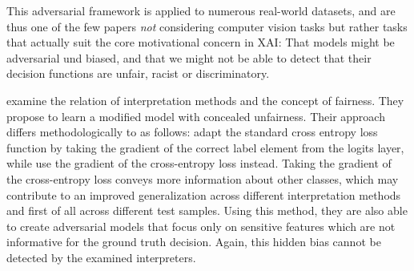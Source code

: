 This adversarial framework is applied to numerous real-world datasets, and are thus one of the few papers \textit{not} considering computer vision tasks but rather tasks that actually suit the core motivational concern in XAI: That models might be adversarial und biased, and that we might not be able to detect that their decision functions are unfair, racist or discriminatory. 

\cite{dimanov2020you} examine the relation of interpretation methods and the concept of fairness. They propose to learn a modified model with concealed unfairness. Their approach differs methodologically to \cite{fooling_nn_interpreters} as follows: 
\cite{fooling_nn_interpreters} adapt the standard cross entropy loss function by taking the gradient of the correct label element from the logits layer, while \cite{dimanov2020you} use the gradient of the cross-entropy loss instead. 
Taking the gradient of the cross-entropy loss conveys more information about other classes, which may contribute to an improved generalization across different interpretation methods and first of all across different test samples. 
Using this method, they are also able to create adversarial models that focus only on sensitive features which are not informative for the ground truth decision. Again, this hidden bias cannot be detected by the examined interpreters. 
